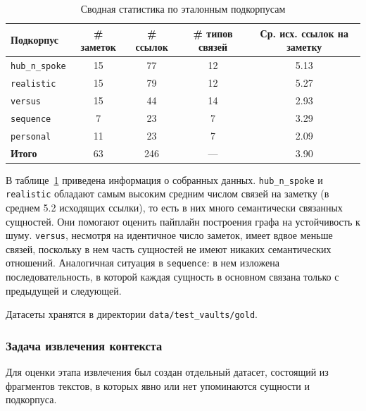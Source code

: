 \begin{table}[H]
      \caption{Сводная статистика по эталонным подкорпусам}
      \label{tab:dataset_samples}
      \centering
      \begin{tabular}{lcccc}
            \hline
            Подкорпус              & \# заметок & \# ссылок & \# типов связей & Ср. исх. ссылок на заметку \\
            \hline
            \texttt{hub\_n\_spoke} & 15         & 77        & 12              & 5.13                       \\
            \texttt{realistic}     & 15         & 79        & 12              & 5.27                       \\
            \texttt{versus}        & 15         & 44        & 14              & 2.93                       \\
            \texttt{sequence}      & 7          & 23        & 7               & 3.29                       \\
            \texttt{personal}      & 11         & 23        & 7               & 2.09                       \\
            \hline
            \textbf{Итого}         & 63         & 246       & ---             & 3.90                       \\
            \hline
      \end{tabular}
\end{table}


В таблице~\ref{tab:dataset_samples} приведена информация о собранных данных.
\texttt{hub\_n\_spoke} и \texttt{realistic} обладают самым высоким средним числом связей на заметку
(в среднем 5.2 исходящих ссылки),
то есть в них много семантически связанных сущностей.
Они помогают оценить пайплайн построения графа на устойчивость к шуму.
\texttt{versus}, несмотря на идентичное число заметок, имеет вдвое меньше
связей, поскольку в нем часть сущностей не имеют никаких семантических отношений.
Аналогичная ситуация в \texttt{sequence}: в нем изложена последовательность,
в которой каждая сущность в основном связана только с предыдущей и следующей.

Датасеты хранятся в директории \texttt{data/test\_vaults/gold}.

\subsubsection{Задача извлечения контекста}

Для оценки этапа извлечения был создан отдельный датасет,
состоящий из фрагментов текстов, в которых явно или нет
упоминаются сущности и подкорпуса.

